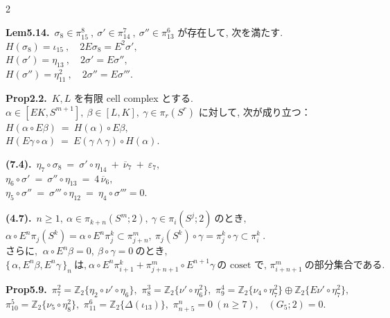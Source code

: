 \documentclass[10pt, leqno]{ltjsarticle}
\newcommand{\ov}[1]{\overline{#1}}
\newcommand{\todai}[2][]{\{\,#2\,\}_{#1}}      %
\newcommand{\gen}[1]{\{#1\}}       %
\newcommand{\pis}[2]{\pi_{#1}(#2)}       %
\newcommand{\pit}[2]{\pi_{#1}^{#2}}
\numberwithin{equation}{section}
\theoremstyle{plain}
\theoremstyle{definition}
\theoremstyle{remark}
\begin{document}
\begin{paracol}{2}
\switchcolumn

\noindent
\textbf{Lem5.14.}\
\(\sigma_{8}\in\pi^{8}_{15}\ , \ \sigma'\in\pi^{7}_{14}\ , \ \sigma''\in\pi^{6}_{13}\) 
が存在して, 次を満たす. \\
\(H(\sigma_{8})=\iota_{15} \ ,\quad 2E\sigma_{8}=E^{2}\sigma',\)\\
\(H(\sigma')=\eta_{13} \ ,\quad 2\sigma'=E\sigma'',\)\\
\(H(\sigma'')=\eta_{11}^2 \ ,\quad 2\sigma''=E\sigma''' .\)

\noindent
\textbf{Prop2.2.}\
$K,L$ を有限 cell complex とする. \\
$\alpha\in[EK, S^{m+1}], \ \beta\in[L,K], \ \gamma\in\pi_r(S^r)$ 
に対して, 次が成り立つ：\\
\(
H(\alpha\circ E\beta)\ =\ H(\alpha)\circ E\beta,
\)\\
\(
H(E\gamma\circ\alpha)\ =\ E(\gamma\wedge\gamma)\circ H(\alpha).
\)

\noindent
\textbf{(7.4).}\
\(\eta_{7}\circ\sigma_{8}\ =\ \sigma'\circ\eta_{14}\ +\ \ov{\nu}_{7}\ +\ \varepsilon_{7},\) \\
\(\eta_{6}\circ\sigma'\ =\ \sigma''\circ\eta_{13}\ =\ 4\,\ov{\nu}_{6}, \)\\
\(\eta_5\circ\sigma'' \ =\ \sigma'''\circ\eta_{12}\ =\ \eta_4\circ\sigma''' = 0. \)

\noindent
\textbf{(4.7).}\
\(n\ge1, \ \alpha\in\pis{k+n}{S^m; 2},\ \gamma\in\pis{i}{S^j; 2}
    \ \text{のとき, }\)\\
\(\alpha\circ E^n\pis{j}{S^k} = \alpha\circ E^n \pit{j}{k}
  \subset \pit{j+n}{m},
  \ \pis{j}{S^k}\circ\gamma = \pit{j}{k}\circ\gamma \subset\pit{i}{k}\ . \)\\
\(\text{さらに, }\ \alpha\circ E^n\beta=0,\ \beta\circ\gamma = 0 \ \text{のとき, }\)\\
\(\todai[n]{\alpha, E^n\beta, E^n\gamma}\ \text{は,}\
  \alpha\circ E^n\pit{i+1}{k} + \pit{j+n+1}{m}\circ E^{n+1}\gamma\
  \text{の coset で, }\pit{i+n+1}{m} \ \text{の部分集合である. }\)

\noindent
\textbf{Prop5.9.}\
\(\pi^{2}_{7}=\mathbb Z_2\gen{\eta_{2}\circ\nu'\circ\eta_6},\) \quad
\(\pi^{3}_{8}=\mathbb Z_2\gen{\nu'\circ\eta_6^2},\) \quad
\(\pi^{4}_{9}=\mathbb Z_2\gen{\nu_{4}\circ\eta_7^2}\oplus \mathbb Z_2\gen{E\nu'\circ\eta_7^2},\) \\
\(\pi^{5}_{10}=\mathbb Z_2\gen{\nu_{5}\circ\eta_8^2},\) \quad
\(\pi^{6}_{11}=\mathbb Z_2\gen{\Delta(\iota_{13})},\) \quad
\(\pi^{n}_{n+5}=0\ (n\ge7),\) \
\((G_{5};2)=0.\)


\end{paracol}
\end{document}
